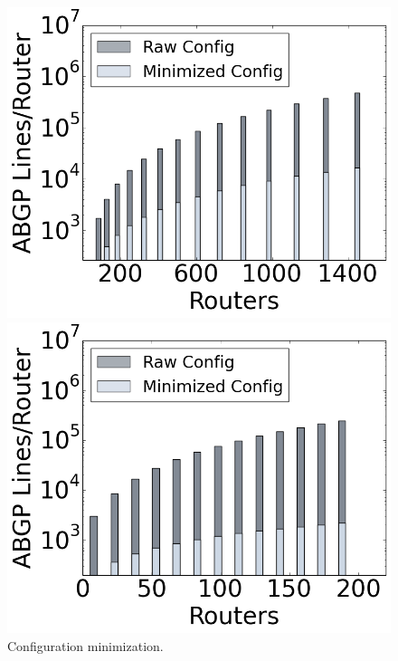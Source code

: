 \begin{figure}[t!]
  \centering
  \begin{minipage}[b]{0.45\linewidth}
    \includegraphics[width=1.1\columnwidth]{figures/config-compression-dc.png}
  \end{minipage}
  \quad
  \begin{minipage}[b]{0.45\linewidth}
    \includegraphics[width=1.1\columnwidth]{figures/config-compression-backbone.png}
  \end{minipage}
  \caption{Configuration minimization.}
  \label{fig:minipage2}
\end{figure}

